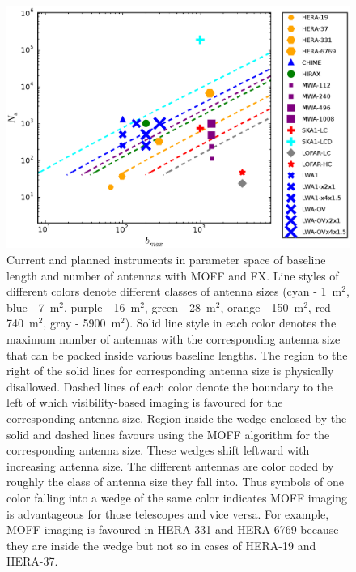 \documentclass[a4paper,fleqn,usenatbib]{mnras}
\begin{document}
\begin{figure}
  \includegraphics[width=\columnwidth]{figure12}
  \caption{Current and planned instruments in parameter space of
    baseline length and number of antennas with MOFF and FX. Line styles of 
    different colors denote different classes of antenna sizes (cyan - 1~m$^2$, 
    blue - 7~m$^2$, purple - 16~m$^2$, green - 28~m$^2$, orange - 150~m$^2$, 
    red - 740~m$^2$, gray - 5900~m$^2$). Solid line style in each color denotes 
    the maximum number of antennas with the corresponding antenna size that can 
    be packed inside various baseline lengths. The region to the right of the 
    solid lines for corresponding antenna size is physically disallowed. Dashed
    lines of each color denote the boundary to the left of which 
    visibility-based imaging is favoured for the corresponding antenna size. 
    Region inside the wedge enclosed by the solid and dashed lines favours using 
    the MOFF algorithm for the corresponding antenna size. These wedges shift 
    leftward with increasing antenna size. The different antennas are color 
    coded by roughly the class of antenna size they fall into. Thus symbols of 
    one color falling into a wedge of the same color indicates MOFF imaging is 
    advantageous for those telescopes and vice versa. For example, MOFF imaging
    is favoured in HERA-331 and HERA-6769 because they are inside the wedge 
    but not so in cases of HERA-19 and HERA-37.}
  \label{fig:parameter-space-bll-nant-instruments}
\end{figure}
\end{document}
